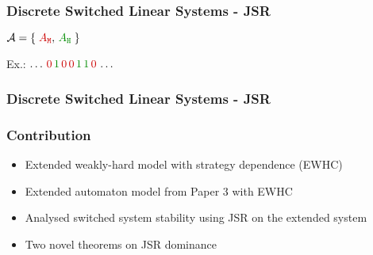 \begin{frame}
    \frametitle{Discrete Switched Linear Systems - JSR}
    \begin{minipage}{0.59\textwidth}
        \begin{figure}[h]
            \centering
            
        \end{figure}
    \end{minipage}\hfill
    \begin{minipage}{0.39\textwidth}
        \begin{figure}[h]
            \centering
        \end{figure}
    \end{minipage}

    \begin{minipage}{0.59\textwidth}
        \centering
        \large
        $\mathcal{A} = \left\{ \;\textcolor{red!80!black}{A_{\texttt{M}}}, \,\textcolor{lqgcolour}{A_{\texttt{H}}}\; \right\}$
    \end{minipage}\hfill
    \begin{minipage}{0.39\textwidth}
        \centering
        \large
        Ex.: $\dots \,\textcolor{red!80!black}{0} \, \textcolor{lqgcolour}{1} \, \textcolor{red!80!black}{0} \, \textcolor{red!80!black}{0} \, \textcolor{lqgcolour}{1} \, \textcolor{lqgcolour}{1}\, \textcolor{red!80!black}{0} \,\dots$
    \end{minipage}
\end{frame}


\begin{frame}
    \frametitle{Discrete Switched Linear Systems - JSR}
    \begin{figure}[h]
        \centering
        
    \end{figure}
\end{frame}


\begin{frame}
    \frametitle{Contribution}
    \begin{itemize}\setlength\itemsep{1em}
        \item Extended weakly-hard model with strategy dependence (EWHC)
        \item Extended automaton model from Paper 3 with EWHC
        \item Analysed switched system stability using JSR on the extended system
        \item Two novel theorems on JSR dominance
    \end{itemize}
\end{frame}
